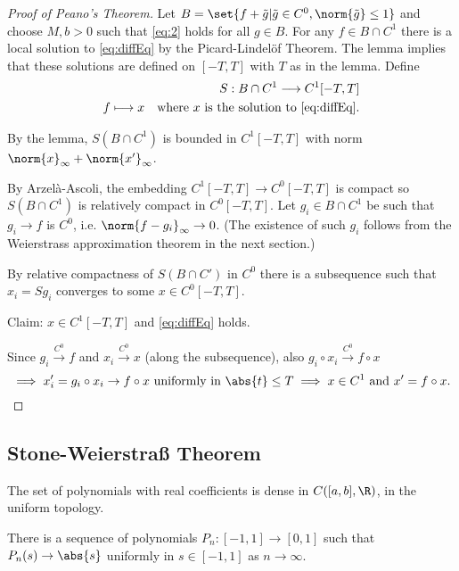 \documentclass{article}
\begin{document}
\begin{proof}[Proof of Peano's Theorem]
    Let $B = \set{f + \tilde{g} | \tilde{g} \in C^0, \norm{\tilde{g}} \leq 1}$ and choose $M, b > 0$ such that \eqref{eq:2} holds for all $g \in B$.
    For any $f \in B \cap C^1$ there is a local solution to \eqref{eq:diffEq} by the Picard-Lindel\"of Theorem.
    The lemma implies that these solutions are defined on $[-T,T]$ with $T$ as in the lemma.
    Define
    \begin{align*}
        S:B \cap C^1 \longrightarrow C^1[-T, T] \\
        f \longmapsto x \quad \text{where $x$ is the solution to \eqref{eq:diffEq}.}
    \end{align*}

    By the lemma, $S(B \cap C^1)$ is bounded in $C^1[-T, T]$ with norm $\norm{x}_\infty + \norm{x'}_\infty$.

    By Arzel\`a-Ascoli, the embedding $C^1[-T, T] \to C^0 [-T, T]$ is compact so $S(B \cap C^1)$ is relatively compact in $C^0[-T, T]$.
    Let $g_i \in B \cap C^1$ be such that $g_i \to f$ is $C^0$, i.e. $\norm{f - g_i}_\infty \to 0$.
    (The existence of such $g_i$ follows from the Weierstrass approximation theorem in the next section.)

    By relative compactness of $S(B \cap C')$ in $C^0$ there is a subsequence such that $x_i = S g_i$ converges to some $x \in C^0[-T, T]$.

    Claim: $x \in C^1[-T, T]$ and \eqref{eq:diffEq} holds.

    Since $g_i \xrightarrow{C^0} f$ and $x_i \xrightarrow{C^0} x$ (along the subsequence), also $g_i \circ x_i \xrightarrow{C^0} f \circ x$
    \begin{equation*}
        \implies x_i' = g_i \circ x_i \to f \circ x \text{ uniformly in } \abs{t} \leq T \\
        \implies x \in C^1 \text{ and } x' = f \circ x.
    \end{equation*}
\end{proof}


\subsection{Stone-Weierstra{\ss} Theorem}

\begin{thm}
    The set of polynomials with real coefficients is dense in $C([a,b], \R)$, in the uniform topology.
\end{thm}
\begin{lemma}
    There is a sequence of polynomials $P_n:[-1, 1] \to [0, 1]$ such that $P_n(s) \to \abs{s}$ uniformly in $s \in [-1, 1]$ as $n \to \infty$.
\end{lemma}
\end{document}
